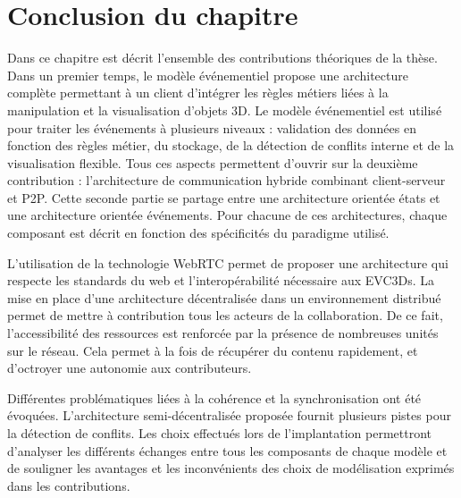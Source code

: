 \section{Conclusion du chapitre}
Dans ce chapitre est décrit l'ensemble des contributions théoriques de la thèse. 
Dans un premier temps, le modèle événementiel propose une architecture 
complète permettant à un client d'intégrer les règles métiers liées à la manipulation 
et la visualisation d'objets 3D. Le modèle événementiel est utilisé pour traiter les 
événements à plusieurs niveaux : validation des données en fonction des règles 
métier, du stockage, de la détection de conflits interne et de la visualisation flexible. Tous 
ces aspects permettent d'ouvrir sur la deuxième contribution : 
l'architecture de communication hybride combinant client-serveur et \gls{P2P}.
Cette seconde partie se partage entre une architecture \og orientée états\fg{} et 
une architecture \og orientée événements\fg{}. Pour chacune de ces architectures, chaque composant est décrit en fonction des spécificités du paradigme utilisé. 

L'utilisation de la 
technologie WebRTC permet de proposer une 
architecture qui respecte les standards du web et l'interopérabilité nécessaire aux \glspl{EVC3D}. La mise en place d'une architecture décentralisée dans un 
environnement distribué permet de mettre à contribution tous les acteurs de la 
collaboration. De ce fait, l'accessibilité des ressources est renforcée par la 
présence de nombreuses unités sur le réseau. Cela permet à la fois 
de récupérer du contenu rapidement, et d'octroyer une autonomie aux 
contributeurs. 

Différentes problématiques liées à la cohérence et la synchronisation ont été 
évoquées. L'architecture semi-décentralisée proposée fournit plusieurs 
pistes pour la détection de conflits. Les choix effectués lors de l'implantation permettront d'analyser les différents échanges entre tous 
les composants de chaque modèle et de souligner les avantages et les 
inconvénients des choix de modélisation exprimés dans les contributions.
